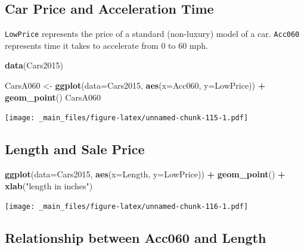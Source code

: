 \documentclass[]{book}
\newenvironment{Shaded}{\begin{snugshade}}{\end{snugshade}}
\newcommand{\KeywordTok}[1]{\textcolor[rgb]{0.13,0.29,0.53}{\textbf{#1}}}
\newcommand{\DataTypeTok}[1]{\textcolor[rgb]{0.13,0.29,0.53}{#1}}
\newcommand{\StringTok}[1]{\textcolor[rgb]{0.31,0.60,0.02}{#1}}
\newcommand{\OperatorTok}[1]{\textcolor[rgb]{0.81,0.36,0.00}{\textbf{#1}}}
\newcommand{\NormalTok}[1]{#1}
\begin{document}
\subsection{Car Price and Acceleration
Time}\label{car-price-and-acceleration-time}

\texttt{LowPrice} represents the price of a standard (non-luxury) model
of a car. \texttt{Acc060} represents time it takes to accelerate from 0
to 60 mph.

\begin{Shaded}
\begin{Highlighting}[]
\KeywordTok{data}\NormalTok{(Cars2015)}
\end{Highlighting}
\end{Shaded}

\begin{Shaded}
\begin{Highlighting}[]
\NormalTok{CarsA060 <-}\StringTok{ }\KeywordTok{ggplot}\NormalTok{(}\DataTypeTok{data=}\NormalTok{Cars2015, }\KeywordTok{aes}\NormalTok{(}\DataTypeTok{x=}\NormalTok{Acc060, }\DataTypeTok{y=}\NormalTok{LowPrice)) }\OperatorTok{+}\StringTok{ }\KeywordTok{geom_point}\NormalTok{() }
\NormalTok{CarsA060}
\end{Highlighting}
\end{Shaded}

\texttt{[image: \_main\_files/figure-latex/unnamed-chunk-115-1.pdf]}

\subsection{Length and Sale Price}\label{length-and-sale-price}

\begin{Shaded}
\begin{Highlighting}[]
\KeywordTok{ggplot}\NormalTok{(}\DataTypeTok{data=}\NormalTok{Cars2015, }\KeywordTok{aes}\NormalTok{(}\DataTypeTok{x=}\NormalTok{Length, }\DataTypeTok{y=}\NormalTok{LowPrice)) }\OperatorTok{+}\StringTok{ }\KeywordTok{geom_point}\NormalTok{() }\OperatorTok{+}\StringTok{ }\KeywordTok{xlab}\NormalTok{(}\StringTok{"length in inches"}\NormalTok{)}
\end{Highlighting}
\end{Shaded}

\texttt{[image: \_main\_files/figure-latex/unnamed-chunk-116-1.pdf]}

\subsection{Relationship between Acc060 and
Length}\label{relationship-between-acc060-and-length}
\end{document}
